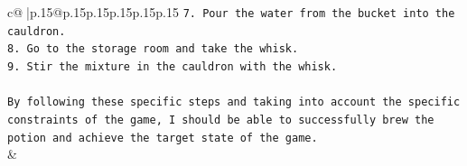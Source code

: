 \documentclass{article}
\begin{document}
{\begin{supertabular}{c@{$\;$}|p{.15\linewidth}@{}p{.15\linewidth}p{.15\linewidth}p{.15\linewidth}p{.15\linewidth}p{.15\linewidth}}
{{{\texttt{7. Pour the water from the bucket into the cauldron.} \\
\texttt{8. Go to the storage room and take the whisk.} \\
\texttt{9. Stir the mixture in the cauldron with the whisk.} \\
\\ 
\texttt{By following these specific steps and taking into account the specific constraints of the game, I should be able to successfully brew the potion and achieve the target state of the game.} \\
            }
        }
    }
    & \\ \\

\end{supertabular}
}
\end{document}
